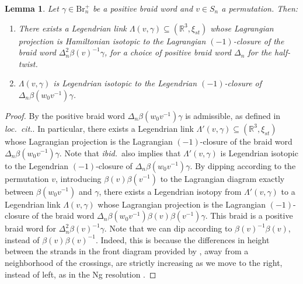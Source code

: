 \documentclass[10pt]{amsart}
\theoremstyle{plain}
\newtheorem{lemma}[thm]{Lemma}
\theoremstyle{definition}
\theoremstyle{remark}
\numberwithin{equation}{section}
\newcommand{\R}{\mathbb{R}}
\newcommand{\La}{\Lambda}
\newcommand{\sse}{\subseteq}
\newcommand{\Br}{\mathrm{Br}}
\newcommand{\MG}[1]{{\color{teal}{{\bf Misha}: #1}}}
\begin{document}
\begin{lemma}\label{lem:neg_cross} Let $\gamma\in\Br_n^+$ be a positive braid word and $v\in S_n$ a permutation. Then:
\begin{enumerate}
    \item There exists a Legendrian link $\La(v,\gamma)\sse (\R^{3},\xi_{st})$ whose Lagrangian projection is Hamiltonian isotopic to the Lagrangian $(-1)$-closure of the braid word $\Delta_n^{2}\beta(v)^{-1}\gamma$, for a choice of positive braid word $\Delta_n$ for the half-twist.\\

    \item $\La(v,\gamma)$ is Legendrian isotopic to the Legendrian $(-1)$-closure of $\Delta_n\beta(w_0v^{-1})\gamma$.
\end{enumerate}
\end{lemma}

\begin{proof}
By \cite[Prop.~2.7]{CasalsNg} the positive braid word $\Delta_n\beta(w_0v^{-1})\gamma$ is admissible, as defined in \emph{loc.~cit.}. In particular, there exists a Legendrian link $\La'(v,\gamma)\sse (\R^{3},\xi_{st})$ whose Lagrangian projection is the Lagrangian $(-1)$-closure of the braid word $\Delta_n\beta(w_0v^{-1})\gamma$. Note that \emph{ibid.}~also implies that $\La'(v,\gamma)$ is Legendrian isotopic to the Legendrian $(-1)$-closure of $\Delta_n\beta(w_0v^{-1})\gamma$. By dipping according to the permutation $v$, introducing $\beta(v)\beta(v^{-1})$ to the Lagrangian diagram exactly between $\beta(w_0v^{-1})$ and $\gamma$, there exists a Legendrian isotopy from $\La'(v,\gamma)$ to a Legendrian link $\La(v,\gamma)$ whose Lagrangian projection is the Lagrangian $(-1)$-closure of the braid word $\Delta_n\beta(w_0v^{-1})\beta(v)\beta(v^{-1})\gamma$. This braid is a positive braid word for $\Delta_n^{2}\beta(v)^{-1}\gamma$. Note that we can dip according to $\beta(v)^{-1}\beta(v)$, instead of $\beta(v)\beta(v)^{-1}$. Indeed, this is because the differences in height between the strands in the front diagram provided by \cite[Prop.~2.7]{CasalsNg}, away from a neighborhood of the crossings, are strictly increasing as we move to the right, instead of left, as in the Ng resolution \cite{Ng03}.\end{proof}


\end{document}

